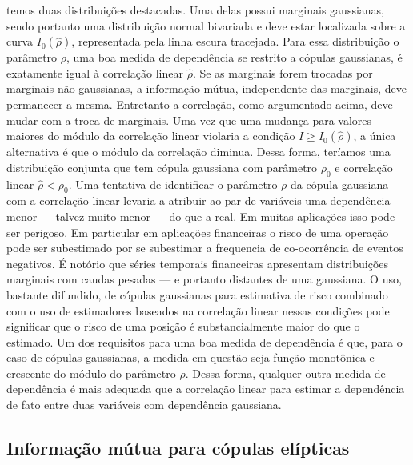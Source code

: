  temos duas distribuições destacadas. Uma delas possui marginais gaussianas, sendo portanto uma distribuição normal bivariada e deve estar localizada sobre a curva $I_{0}(\hat{\rho})$, representada pela linha escura tracejada. Para essa distribuição o parâmetro $\rho$, uma boa medida de dependência se restrito a cópulas gaussianas, é exatamente igual à correlação linear $\hat{\rho}$. Se as marginais forem trocadas por marginais não-gaussianas, a informação mútua, independente das marginais, deve permanecer a mesma. Entretanto a correlação, como argumentado acima, deve mudar com a troca de marginais. Uma vez que uma mudança para valores maiores do módulo da correlação linear violaria a condição $I\ge I_{0}(\hat{\rho})$, a única alternativa é que o módulo da correlação diminua. Dessa forma, teríamos uma distribuição conjunta que tem cópula gaussiana com parâmetro $\rho_0$ e correlação linear $\hat{\rho} < \rho_{0}$. Uma tentativa de identificar o parâmetro $\rho$ da cópula gaussiana com a correlação linear levaria a atribuir ao par de variáveis uma dependência menor --- talvez muito menor --- do que a real. Em muitas aplicações isso pode ser perigoso. Em particular em aplicações financeiras o risco de uma operação pode ser subestimado por se subestimar a frequencia de co-ocorrência de eventos negativos. É notório que séries temporais financeiras apresentam distribuições marginais com caudas pesadas --- e portanto distantes de uma gaussiana. O uso, bastante difundido\cite{FT2009}, de cópulas gaussianas para estimativa de risco combinado com o uso de estimadores baseados na correlação linear nessas condições pode significar que o risco de uma posição é substancialmente maior do que o estimado. Um dos requisitos para uma boa medida de dependência é que, para o caso de cópulas gaussianas, a medida em questão seja função monotônica e crescente do módulo do parâmetro $\rho$. Dessa forma, qualquer outra medida de dependência é mais adequada que a correlação linear para estimar a dependência de fato entre duas variáveis com dependência gaussiana.

\subsection{Informação mútua para cópulas elípticas}

